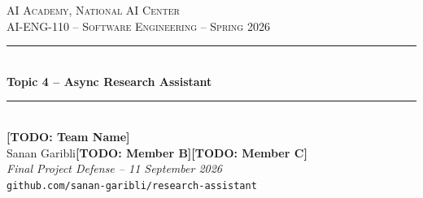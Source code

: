 \documentclass[aspectratio=169,11pt]{beamer}
\newcommand{\TODO}[1]{\textcolor{accent2}{\textbf{[TODO: #1]}}}
\newcommand{\teamname}{\TODO{Team Name}}
\newcommand{\topicchoice}{Topic 4 -- Async Research Assistant}
\newcommand{\memberone}{Sanan Garibli}
\newcommand{\membertwo}{\TODO{Member B}}
\newcommand{\memberthree}{\TODO{Member C}}
\newcommand{\repolink}{github.com/sanan-garibli/research-assistant}
\newcommand{\coursecode}{AI-ENG-110}
\newcommand{\coursename}{Software Engineering}
\newcommand{\institution}{AI Academy, National AI Center}
\newcommand{\semester}{Spring 2026}
\begin{document}
{%
\begin{frame}[plain]
  \begin{center}
    \vspace{0.6cm}
    {\small \textsc{\institution}}\\[0.2em]
    {\small \textsc{\coursecode{} -- \coursename{} -- \semester{}}}\\[1.2em]
    \rule{0.7\textwidth}{0.6pt}\\[0.4em]
    {\Huge\bfseries\color{accent} \topicchoice}\\[0.4em]
    \rule{0.7\textwidth}{0.6pt}\\[1.2em]
    {\large \teamname}\\[0.6em]
    {\normalsize \memberone\quad\textbullet\quad\membertwo\quad\textbullet\quad\memberthree}\\[1cm]
    {\footnotesize\itshape Final Project Defense -- 11 September 2026}\\[0.4em]
    {\footnotesize\texttt{\repolink}}
  \end{center}
\end{frame}
}
\end{document}
